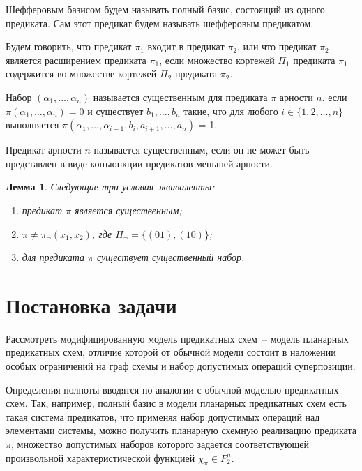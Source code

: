 \documentclass[12pt]{article}
\newtheorem{lemma}[theorem]{Лемма}
\newenvironment{definition}[1][Определение]{\begin{trivlist}
\item[\hskip \labelsep {\bfseries #1}]}{\end{trivlist}}
\begin{document}
\begin{definition}
Шефферовым базисом будем называть полный базис, состоящий из одного предиката. Сам этот предикат
будем называть шефферовым предикатом.
\end{definition}


\begin{definition}
Будем говорить, что предикат $\pi_1$ входит в предикат $\pi_2$, или что предикат $\pi_2$ является
расширением предиката $\pi_1$, если множество кортежей $\Pi_1$ предиката $\pi_1$ 
содержится во множестве кортежей $\Pi_2$ предиката $\pi_2$.
\end{definition}

\begin{definition}
Набор $(\alpha_1, \dots, \alpha_n)$ называется существенным для предиката $\pi$ арности $n$, если
$\pi(\alpha_1, \dots, \alpha_n) = 0$ и существует $b_1, \dots, b_n$ такие, что для любого $i \in \{ 1, 2, \dots, n\}$
выполняется 
$\pi(\alpha_1, \dots, \alpha_{i-1}, b_i, a_{i+1}, \dots, a_n)$ = 1.
\end{definition}

\begin{definition}
Предикат арности $n$ называется существенным, если он не может быть представлен в виде конъюнкции
предикатов меньшей арности.
\end{definition}

\begin{lemma}
\label{susch_lemma}
Следующие три условия эквиваленты: 
\begin{enumerate}
\item предикат $\pi$ является существенным;
\item $\pi \neq \pi_{\neg}(x_1, x_2)$, где $\Pi_{\neg} = \{ (01), (10) \}$;
\item для предиката $\pi$ существует существенный набор. 
\end{enumerate}\cite{Zhuk}
\end{lemma}

\clearpage

\section{Постановка задачи}
Рассмотреть модифицированную модель предикатных схем~-- модель планарных предикатных схем, 
отличие которой от обычной модели состоит в наложении особых ограничений на граф схемы и набор допустимых операций 
суперпозиции. 

Определения полноты вводятся по аналогии с обычной моделью предикатных схем. Так, например, полный базис
в модели планарных предикатных схем есть такая система предикатов, что 
применяя набор допустимых
операций над элементами системы, можно получить планарную схемную реализацию предиката $\pi$, множество
допустимых наборов которого задается соответствующей произвольной характеристической функцией $\chi_{\pi} \in P_2^n$. 
\end{document}
